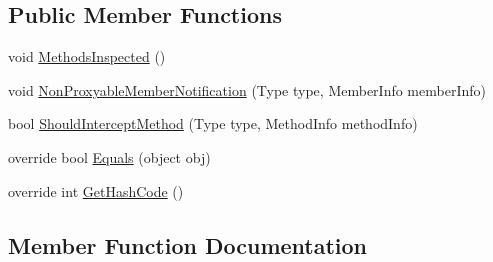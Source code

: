\subsection*{Public Member Functions}
\begin{DoxyCompactItemize}
\item 
void \hyperlink{class_demgel_redis_1_1_object_manager_1_1_proxy_1_1_general_proxy_generation_hook_a1691b331e2bb491d0b90c528d3e64ba5}{Methods\+Inspected} ()
\item 
void \hyperlink{class_demgel_redis_1_1_object_manager_1_1_proxy_1_1_general_proxy_generation_hook_a0d39156f6d7237928fa1b6b665b9b442}{Non\+Proxyable\+Member\+Notification} (Type type, Member\+Info member\+Info)
\item 
bool \hyperlink{class_demgel_redis_1_1_object_manager_1_1_proxy_1_1_general_proxy_generation_hook_ac345f4cf7ff172be02a2a40f6518a67f}{Should\+Intercept\+Method} (Type type, Method\+Info method\+Info)
\item 
override bool \hyperlink{class_demgel_redis_1_1_object_manager_1_1_proxy_1_1_general_proxy_generation_hook_abac1d2ea3a8525d5b5be47826d5afc71}{Equals} (object obj)
\item 
override int \hyperlink{class_demgel_redis_1_1_object_manager_1_1_proxy_1_1_general_proxy_generation_hook_acb74bd4dc8433d3115a65c3fff1e09c7}{Get\+Hash\+Code} ()
\end{DoxyCompactItemize}


\subsection{Member Function Documentation}
\hypertarget{class_demgel_redis_1_1_object_manager_1_1_proxy_1_1_general_proxy_generation_hook_abac1d2ea3a8525d5b5be47826d5afc71}{}
